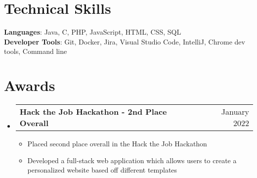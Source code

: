 \documentclass[letterpaper,11pt]{article}
\makeatletter
\newcommand{\resumeItem}[1]{
  \item\small{
    {#1 \vspace{-2pt}}
  }
}
\newcommand{\resumeAwardHeading}[2]{
  \vspace{-2pt}\item
    \begin{tabular*}{0.97\textwidth}[t]{l@{\extracolsep{\fill}}r}
      \textbf{#1} & #2 \\
    \end{tabular*}\vspace{-7pt}
}
\newcommand{\resumeSubHeadingListStart}{\begin{itemize}[leftmargin=0.15in, label={}]}
\newcommand{\resumeSubHeadingListEnd}{\end{itemize}}
\newcommand{\resumeItemListStart}{\begin{itemize}}
\newcommand{\resumeItemListEnd}{\end{itemize}\vspace{-5pt}}
\makeatother
\begin{document}
%
\section{Technical Skills}
 \begin{itemize}[leftmargin=0.15in, label={}]
    \small{\item{
     \textbf{Languages}{: Java, C, PHP, JavaScript, HTML, CSS, SQL} \\
     \textbf{Developer Tools}{: Git, Docker, Jira, Visual Studio Code, IntelliJ, Chrome dev tools, Command line} \\
    }}
 \end{itemize}

 \section{Awards}
    \resumeSubHeadingListStart
    \resumeAwardHeading
      {Hack the Job Hackathon - 2nd Place Overall}{January 2022}
      \resumeItemListStart
        \resumeItem{Placed second place overall in the Hack the Job Hackathon}
        \resumeItem{Developed a full-stack web application which allows users to create a personalized website based off different templates}
      \resumeItemListEnd
        \resumeSubHeadingListEnd


\end{document}

